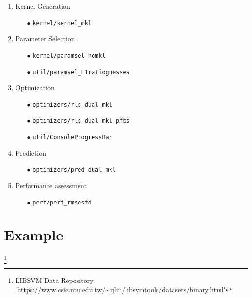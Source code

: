 \documentclass[tablecaption=bottom,wcp]{jmlr} %
\begin{document}
\begin{enumerate}
\item Kernel Generation
\begin{enumerate}
\item [$\bullet$] {\tt kernel/kernel\_mkl}
\end{enumerate}
\item Parameter Selection
\begin{enumerate}
\item [$\bullet$] {\tt kernel/paramsel\_homkl}
\item [$\bullet$] {\tt util/paramsel\_L1ratioguesses}
\end{enumerate}
\item Optimization
\begin{enumerate}
\item [$\bullet$] {\tt optimizers/rls\_dual\_mkl}
\item [$\bullet$] {\tt optimizers/rls\_dual\_mkl\_pfbs}
\item [$\bullet$] {\tt util/ConsoleProgressBar}
\end{enumerate}
\item Prediction
\begin{enumerate}
\item [$\bullet$] {\tt optimizers/pred\_dual\_mkl}
\end{enumerate}
\item Performance assessment
\begin{enumerate}
\item [$\bullet$] {\tt perf/perf\_rmsestd}
\end{enumerate}
\end{enumerate}

\section{Example}

\footnote{LIBSVM Data Repository:
\url{'https://www.csie.ntu.edu.tw/~cjlin/libsvmtools/datasets/binary.html'}}

\newpage

\end{document}
